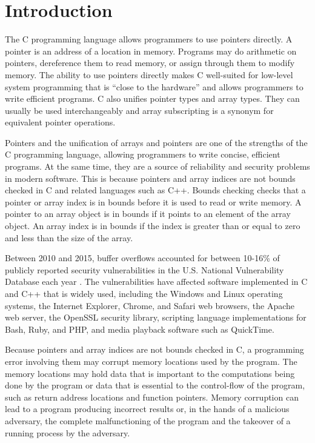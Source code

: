 
\chapter{Introduction}
\label{chapter:introduction}

The C programming language \cite{Ritchie1988, ISO2011} allows programmers to use 
pointers directly. A pointer is an address of a location in memory. Programs may do
arithmetic on pointers, dereference them to read memory, or assign
through them to modify memory. The ability to use pointers directly
makes C well-suited for low-level system programming that is ``close to
the hardware'' and allows programmers to write efficient programs. C
also unifies pointer types and array types. They can usually be used
interchangeably and array subscripting is a synonym for equivalent
pointer operations.

Pointers and the unification of arrays and pointers are one of the
strengths of the C programming language, allowing programmers to write
concise, efficient programs. At the same time, they are a source of
reliability and security problems in modern software. This is
because pointers and array indices are not bounds checked in C and
related languages such as C++. Bounds checking checks that a pointer or
array index is in bounds before it is used to read or write memory. A
pointer to an array object is in bounds if it points to an element of
the array object. An array index is in bounds if the index is greater
than or equal to zero and less than the size of the array.

Between 2010 and 2015, buffer overflows accounted for between 10-16\% of
publicly reported security vulnerabilities in the U.S. National
Vulnerability Database each year \cite{NIST2015}. The vulnerabilities have affected
software implemented in C and C++ that is widely used, including the
Windows and Linux operating systems, the Internet Explorer, Chrome, and
Safari web browsers, the Apache web server, the OpenSSL security
library, scripting language implementations for Bash, Ruby, and PHP, and
media playback software such as QuickTime.

Because pointers and array indices are not bounds checked in C, a
programming error involving them may corrupt memory locations used by
the program. The memory locations may hold data that is important to the
computations being done by the program or data that is essential to the
control-flow of the program, such as return address locations and
function pointers. Memory corruption can lead to a program producing
incorrect results or, in the hands of a malicious adversary, the
complete malfunctioning of the program and the takeover of a running
process by the adversary.

